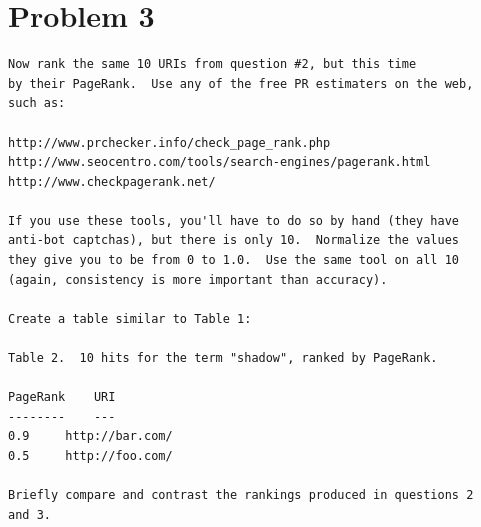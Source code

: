 \section{Problem 3}
\label{part3}
\begin{verbatim}
Now rank the same 10 URIs from question #2, but this time 
by their PageRank.  Use any of the free PR estimaters on the web,
such as:

http://www.prchecker.info/check_page_rank.php
http://www.seocentro.com/tools/search-engines/pagerank.html
http://www.checkpagerank.net/

If you use these tools, you'll have to do so by hand (they have
anti-bot captchas), but there is only 10.  Normalize the values
they give you to be from 0 to 1.0.  Use the same tool on all 10
(again, consistency is more important than accuracy).

Create a table similar to Table 1:

Table 2.  10 hits for the term "shadow", ranked by PageRank.

PageRank	URI
--------	---
0.9		http://bar.com/
0.5		http://foo.com/

Briefly compare and contrast the rankings produced in questions 2
and 3.

\end{verbatim}
